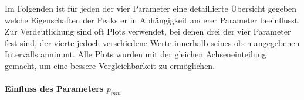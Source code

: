 Im Folgenden ist für jeden der vier Parameter eine detaillierte Übersicht gegeben welche Eigenschaften der Peaks er in Abhängigkeit anderer Parameter beeinflusst. Zur Verdeutlichung sind oft Plots verwendet, bei denen drei der vier Parameter fest sind, der vierte jedoch verschiedene Werte innerhalb seines oben angegebenen Intervalls annimmt. Alle Plots wurden mit der gleichen Achseneinteilung gemacht, um eine bessere Vergleichbarkeit zu ermöglichen.


\paragraph*{Einfluss des Parameters $p_{mm}$}

% 
% 

